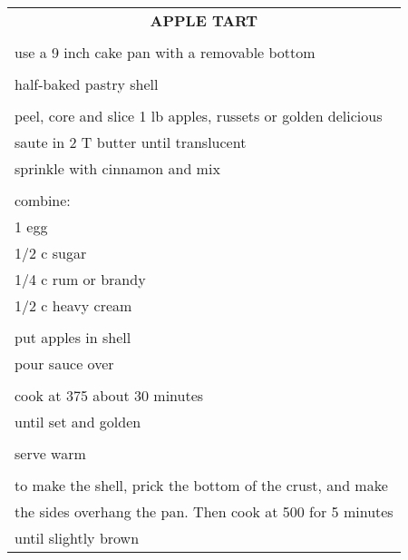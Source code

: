\documentclass[8pt]{report}
\begin{document}
\newpage

\centering

\begin{tabular}{|l|} \hline	%
 
\multicolumn{1}{|c|}{\textbf{APPLE TART}}
\\
\\

\index{desserts!apple tart} \index{apple tart} \index{tart!apple}

use a 9 inch cake pan with a removable bottom\\
\\
half-baked pastry shell\\
\\
peel, core and slice 1 lb apples, russets or golden delicious\\
saute in 2 T butter until translucent\\
sprinkle with cinnamon and mix\\
\\
combine:\\
\hspace{0.5 in}1 egg\\
\hspace{0.5 in}1/2 c sugar\\
\hspace{0.5 in}1/4 c rum or brandy\\
\hspace{0.5 in}1/2 c heavy cream\\
\\
put apples in shell\\
pour sauce over\\
\\
cook at 375 about 30 minutes\\
until set and golden\\
\\
serve warm\\
\\
to make the shell, prick the bottom of the crust, and make\\
the sides overhang the pan.  Then cook at 500 for 5 minutes\\
until slightly brown\\

\hline

\end{tabular}
\end{document}
